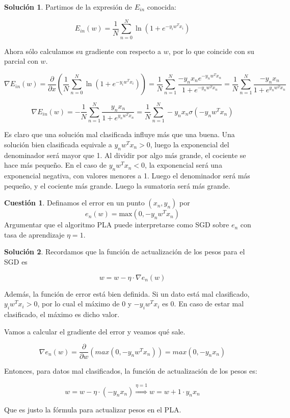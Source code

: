 \documentclass[a4paper, 11pt]{article}
\theoremstyle{definition}
\newtheorem{cuestion}{Cuestión}
\newtheorem*{solucion}{Solución}
\begin{document}
  \begin{solucion}
    Partimos de la expresión de $E_{in}$ conocida:

    $$E_{in}(w) = \frac{1}{N} \sum_{n=0}^{N}\ln \left(1 + e^{-y_iw^Tx_i} \right) $$

    Ahora sólo calculamos su gradiente con respecto a $w$, por lo que coincide con su parcial con $w$.

    $$\nabla E_{in}(w)=\frac{\partial}{\partial x} \left( \frac{1}{N} \sum_{n=0}^{N}\ln \left(1 + e^{-y_iw^Tx_i} \right) \right) = \frac{1}{N}\sum_{n=1}^{N}\frac{-y_nx_ne^{-y_nw^Tx_n}}{1+e^{-y_nw^Tx_n}} = \frac{1}{N}\sum_{n=1}^{N}\frac{-y_nx_n}{1+e^{y_nw^Tx_n}} $$

    $$\nabla E_{in}(w)=-\frac{1}{N}\sum_{n=1}^{N}\frac{y_nx_n}{1+e^{y_nw^Tx_n}} = \frac{1}{N}\sum_{n=1}^{N}-y_nx_n\sigma(-y_nw^Tx_n)$$

    Es claro que una solución mal clasificada influye más que una buena. Una solución bien clasificada equivale a $y_nw^Tx_n > 0$, luego la exponencial del denominador será mayor que 1. Al dividir por algo más grande, el cociente se hace más pequeño. En el caso de $y_nw^Tx_n < 0$, la exponencial será una exponencial negativa, con valores menores a 1. Luego el denominador será más pequeño, y el cociente más grande. Luego la sumatoria será más grande.
  \end{solucion}

  \begin{cuestion}
    Definamos el error en un punto $(x_n,y_n)$ por
      \[
      e_n(w)=\text{max}(0,-y_nw^Tx_n)
      \]
      Argumentar que el algoritmo PLA puede interpretarse como SGD sobre $e_n$ con tasa de aprendizaje $\eta=1$.
  \end{cuestion}

  \begin{solucion}
    Recordamos que la función de actualización de los pesos para el SGD es

    $$ w = w - \eta \cdot \nabla e_n(w) $$

    Además, la función de error está bien definida. Si un dato está mal clasificado, $y_iw^Tx_i > 0$, por lo cual el máximo de 0 y $-y_iw^Tx_i$ es 0. En caso de estar mal clasificado, el máximo es dicho valor.

    Vamos a calcular el gradiente del error y veamos qué sale.

    $$ \nabla e_n(w) = \frac{\partial}{\partial w} \left( max(0, -y_nw^Tx_n) \right) = max(0, -y_nx_n) $$

    Entonces, para datos mal clasificados, la función de actualización de los pesos es:

    $$ w = w - \eta \cdot (-y_nx_n) \overset{\eta=1}{\Rightarrow} w = w + 1 \cdot y_nx_n $$

    Que es justo la fórmula para actualizar pesos en el PLA.
  \end{solucion}
\end{document}
